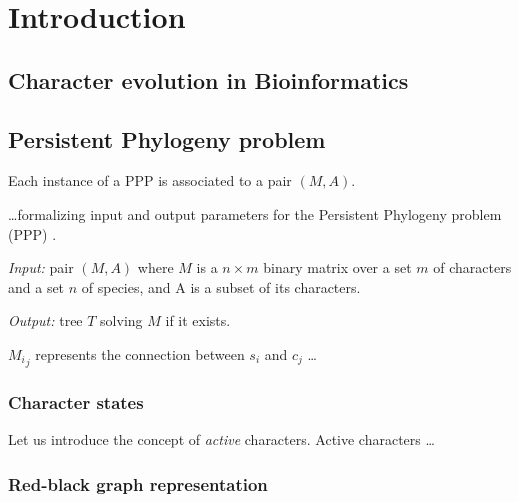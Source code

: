 
\section{Introduction}


\subsection{Character evolution in Bioinformatics}


\subsection{Persistent Phylogeny problem}


Each instance of a PPP is associated to a pair $(M, A)$.

 \dots formalizing input and output parameters for the Persistent Phylogeny problem (PPP) \cite{Bonizzoni2016SolvingTP}.

\begin{Definition}\label{ppp}
  \text{}

  \textit{Input:} pair $(M, A)$ where $M$ is a $n \times m$ binary matrix over a set $m$ of characters and a set $n$ of species, and A is a subset of its characters.

  \textit{Output:} tree $T$ solving $M$ if it exists.
\end{Definition}

${M_i}_j$ represents the connection between $s_i$ and $c_j$ \dots

\subsubsection{Character states}

Let us introduce the concept of \textit{active} characters.
Active characters  \dots

\subsubsection{Red-black graph representation}

